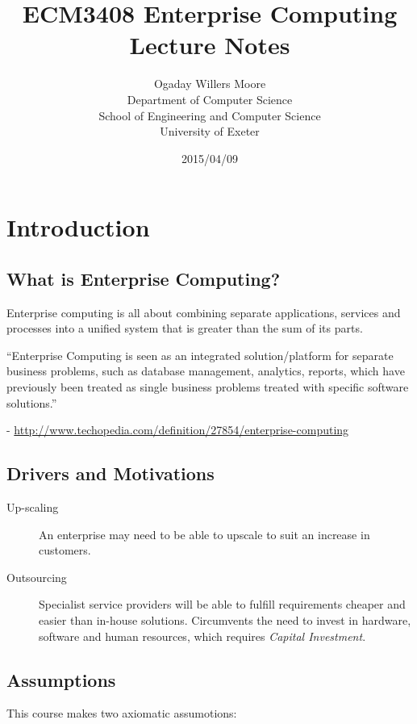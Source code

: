 \documentclass[11pt]{article}
\title{ECM3408 Enterprise Computing Lecture Notes}
\author{Ogaday Willers Moore\\        %
Department of Computer Science\\
School of Engineering and Computer Science\\
University of Exeter}
\date{2015/04/09}
\begin{document}
\maketitle

\tableofcontents

\pagebreak

\section{Introduction}
\label{sec:intro}

\subsection{What is Enterprise Computing?}
Enterprise computing is all about combining separate applications, services and processes into a unified system that is greater than the sum of its parts.
\begin{displayquote}
``Enterprise Computing is seen as an integrated solution/platform for separate business problems, such as database management, analytics, reports, which have previously been treated as single business problems treated with specific software solutions.''
\end{displayquote}

- \url{http://www.techopedia.com/definition/27854/enterprise-computing}

\subsection{Drivers and Motivations}

\begin{description}
\item[Up-scaling] An enterprise may need to be able to upscale to suit an increase in customers.
\item[Outsourcing] Specialist service providers will be able to fulfill requirements cheaper and easier than in-house solutions. Circumvents the need to invest in hardware, software and human resources, which requires \textit{Capital Investment}.
\end{description}

\subsection{Assumptions}

This course makes two axiomatic assumotions:
\end{document}
